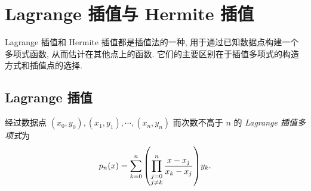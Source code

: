 \section{Lagrange 插值与 Hermite 插值}

Lagrange 插值和 Hermite 插值都是插值法的一种, 用于通过已知数据点构建一个多项式函数, 从而估计在其他点上的函数. 它们的主要区别在于插值多项式的构造方式和插值点的选择.

\subsection{Lagrange 插值}

\begin{definition}
    经过数据点 $(x_0,y_0),(x_1,y_1),\cdots,(x_n,y_n)$ 而次数不高于 $n$ 的 \textit{Lagrange 插值多项式}为 $$p_n(x)=\sum_{k=0}^{n}\qty(\prod_{\substack{j=0\\j\neq k}}^{n}\dfrac{x-x_j}{x_k-x_j})y_k.$$
\end{definition}


